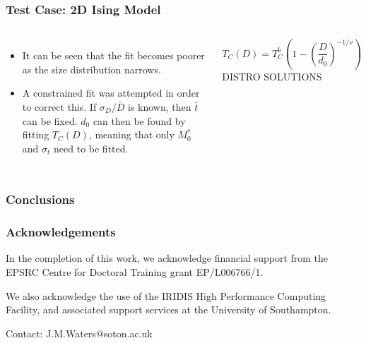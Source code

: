 \documentclass{beamer}
\begin{document}
\begin{frame}
	\frametitle{Test Case: 2D Ising Model}
	\begin{columns}
	\column{7cm}
		\begin{itemize}
		\item{It can be seen that the fit becomes poorer as the size distribution narrows.}
		\item{A constrained fit was attempted in order to correct this. If $\sigma_D/\bar{D}$ is known, then $\bar{t}$ can be fixed. $d_0$ can then be found by fitting $T_C(D)$, meaning that only $M_0^*$ and $\sigma_t$ need to be fitted.}
		\end{itemize}
		$$
		T_C(D) = T_C^b\left(1 - \left(\frac{D}{d_0}\right)^{-1/\nu}\right)
		$$
	\column{5cm}
		DISTRO SOLUTIONS
	\end{columns}
\end{frame}

\begin{frame}
	\frametitle{Conclusions}
\end{frame}

\begin{frame}
	\frametitle{Acknowledgements}
	In the completion of this work, we acknowledge financial support from the EPSRC Centre for Doctoral Training grant EP/L006766/1. \newline
	
	We also acknowledge the use of the IRIDIS High Performance Computing Facility, and associated support services at the University of
Southampton. \newline

	Contact: J.M.Waters@soton.ac.uk
\end{frame}
\end{document}
